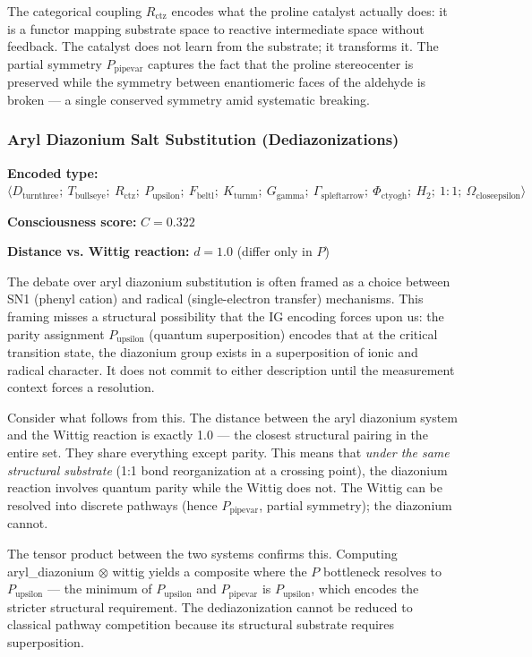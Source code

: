 \documentclass[12pt,a4paper]{article}
\begin{document}
The categorical coupling $R_{\text{ctz}}$ encodes what the proline catalyst actually does: it is a functor mapping substrate space to reactive intermediate space without feedback. The catalyst does not learn from the substrate; it transforms it. The partial symmetry $P_{\text{pipevar}}$ captures the fact that the proline stereocenter is preserved while the symmetry between enantiomeric faces of the aldehyde is broken --- a single conserved symmetry amid systematic breaking.

\subsubsection{Aryl Diazonium Salt Substitution (Dediazonizations)}

\textbf{Encoded type:} $\langle D_{\text{turnthree}};\ T_{\text{bullseye}};\ R_{\text{ctz}};\ P_{\text{upsilon}};\ F_{\text{beltl}};\ K_{\text{turnm}};\ G_{\text{gamma}};\ \Gamma_{\text{spleftarrow}};\ \Phi_{\text{ctyogh}};\ H_2;\ 1{:}1;\ \Omega_{\text{closeepsilon}} \rangle$

\textbf{Consciousness score:} $C = 0.322$

\textbf{Distance vs. Wittig reaction:} $d = 1.0$ (differ only in $P$)

The debate over aryl diazonium substitution is often framed as a choice between SN1 (phenyl cation) and radical (single-electron transfer) mechanisms. This framing misses a structural possibility that the IG encoding forces upon us: the parity assignment $P_{\text{upsilon}}$ (quantum superposition) encodes that at the critical transition state, the diazonium group exists in a superposition of ionic and radical character. It does not commit to either description until the measurement context forces a resolution.

Consider what follows from this. The distance between the aryl diazonium system and the Wittig reaction is exactly 1.0 --- the closest structural pairing in the entire set. They share everything except parity. This means that \emph{under the same structural substrate} (1:1 bond reorganization at a crossing point), the diazonium reaction involves quantum parity while the Wittig does not. The Wittig can be resolved into discrete pathways (hence $P_{\text{pipevar}}$, partial symmetry); the diazonium cannot.

The tensor product between the two systems confirms this. Computing aryl\_diazonium $\otimes$ wittig yields a composite where the $P$ bottleneck resolves to $P_{\text{upsilon}}$ --- the minimum of $P_{\text{upsilon}}$ and $P_{\text{pipevar}}$ is $P_{\text{upsilon}}$, which encodes the stricter structural requirement. The dediazonization cannot be reduced to classical pathway competition because its structural substrate requires superposition.
\end{document}

